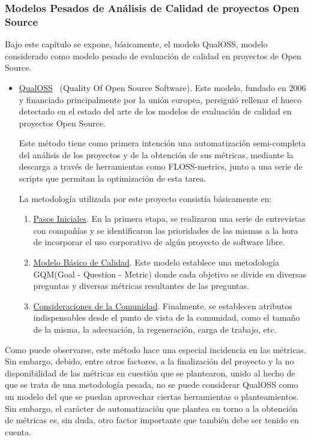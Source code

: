 \documentclass[11pt]{article}
\begin{document}
\subsubsection{Modelos Pesados de Análisis de Calidad de proyectos Open Source}

Bajo este capítulo se expone, básicamente, el modelo QualOSS, modelo considerado como modelo pesado de evaluación de calidad en proyectos de Open Source.
\begin{itemize}
\item{\underline{QualOSS}~\cite{qualoss:qualoss} (Quality Of Open Source Software)}. Este modelo, fundado en 2006 y financiado principalmente por la unión europea, persiguió rellenar el hueco detectado en el estado del arte de los modelos de evaluación de calidad en proyectos Open Source.

Este método tiene como primera intención una automatización semi-completa del análisis de los proyectos y de la obtención de sus métricas, mediante la descarga a través de herramientas como FLOSS-metrics, junto a una serie de scripts que permitan la optimización de esta tarea.

La metodología utilizada por este proyecto consistía básicamente en:
\begin{enumerate}
\item{\underline{Pasos Iniciales}}. En la primera etapa, se realizaron una serie de entrevistas con compañías y se identificaron las prioridades de las mismas a la hora de incorporar el uso corporativo de algún proyecto de software libre.
\item{\underline{Modelo Básico de Calidad}}. Este modelo establece una metodología GQM(Goal - Question - Metric) donde cada objetivo se divide en diversas preguntas y diversas métricas resultantes de las preguntas.
\item{\underline{Consideraciones de la Comunidad}}. Finalmente, se establecen atributos indispensables desde el punto de vista de la comunidad, como el tamaño de la misma, la adecuación, la regeneración, carga de trabajo, etc.
\end{enumerate}
\end{itemize}

Como puede observarse, este método hace una especial incidencia en las métricas. Sin embargo, debido, entre otros factores, a la finalización del proyecto y la no disponibilidad de las métricas en cuestión que se plantearon, unido al hecho de que se trata de una metodología pesada, no se puede considerar QualOSS como un modelo del que se puedan aprovechar ciertas herramientas o planteamientos. Sin embargo, el carácter de automatización que plantea en torno a la obtención de métricas es, sin duda, otro factor importante que también debe ser tenido en cuenta. 
\end{document}
